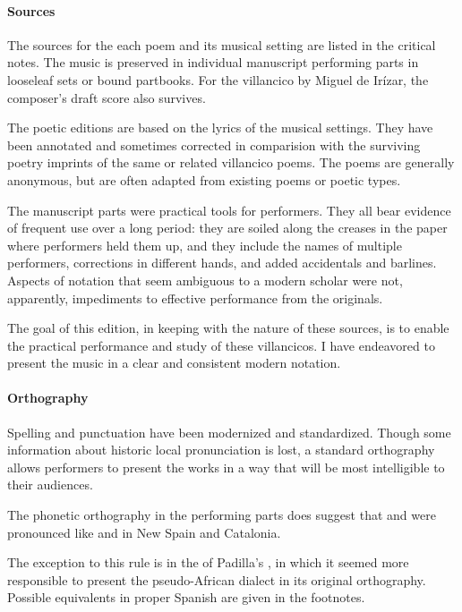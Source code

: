 \paragraph{Sources}

The sources for the each poem and its musical setting are listed in the critical notes.
The music is preserved in individual manuscript performing parts in looseleaf sets or bound partbooks.
For the villancico by Miguel de Irízar, the composer's draft score also survives.

The poetic editions are based on the lyrics of the musical settings.
They have been annotated and sometimes corrected in comparision with the surviving poetry imprints of the same or related villancico poems.
The poems are generally anonymous, but are often adapted from existing poems or poetic types.

The manuscript parts were practical tools for performers.
They all bear evidence of frequent use over a long period: they are soiled along the creases in the paper where performers held them up, and they include the names of multiple performers, corrections in different hands, and added accidentals and barlines.
Aspects of notation that seem ambiguous to a modern scholar were not, apparently, impediments to effective performance from the originals.

The goal of this edition, in keeping with the nature of these sources, is to enable the practical performance and study of these villancicos.
I have endeavored to present the music in a clear and consistent modern notation.


\paragraph{Orthography}
Spelling and punctuation have been modernized and standardized.
Though some information about historic local pronunciation is lost, a standard orthography allows performers to present the works in a way that will be most intelligible to their audiences.%
  \begin{Footnote}
  The phonetic orthography in the performing parts does suggest that  and  were pronounced like  and  in New Spain and Catalonia.
  \end{Footnote}

The exception to this rule is in the  of Padilla's , in which it seemed more responsible to present the pseudo-African dialect in its original orthography.
Possible equivalents in proper Spanish are given in the footnotes.

